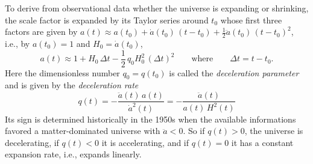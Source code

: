 To derive from observational data whether the universe is expanding or shrinking, the 
scale factor is expanded by its Taylor series around $t_0$ whose first three factors are given by
$
	a(t) \approx a(t_0) + \dot{a}(t_0) \, (t-t_0) + \frac{1}{2} \ddot{a}(t_0) \,(t-t_0)^2
$,
i.e., by $a(t_0) = 1$ and $H_0 = \dot{a}(t_0)$,
\begin{equation}
	a(t) \approx 1 + H_0 \,\Delta t - \frac{1}{2} \, q_0 H_0^2 \, (\Delta t)^2
	\qquad
	\mbox{where}
	\qquad
	\Delta t = t - t_0
	.
	\label{eq:FLRW-scale-factor-Tayler-expansion}
\end{equation}
Here the dimensionless number $q_0 = q(t_0)$ is called the \emph{deceleration parameter} and is given by the \emph{deceleration rate}
\begin{equation}
	q(t) 
	= - \frac{\ddot{a}(t) \, a(t)}{\dot{a}^2(t)} 
	= - \frac{\ddot{a}(t)}{a(t) \, H^2(t)}
	\label{eq:FLRW-deceleration-parameter}
\end{equation}
\cite[101]{Ryden-2017}
Its sign is determined historically in the 1950s when the available informations favored a matter-dominated universe with $\ddot{a} < 0$. So if $q(t) > 0$, the universe is decelerating,
if $q(t) < 0$ it is accelerating, and if $q(t) = 0$ it has a constant expansion rate, i.e., expands linearly. 

